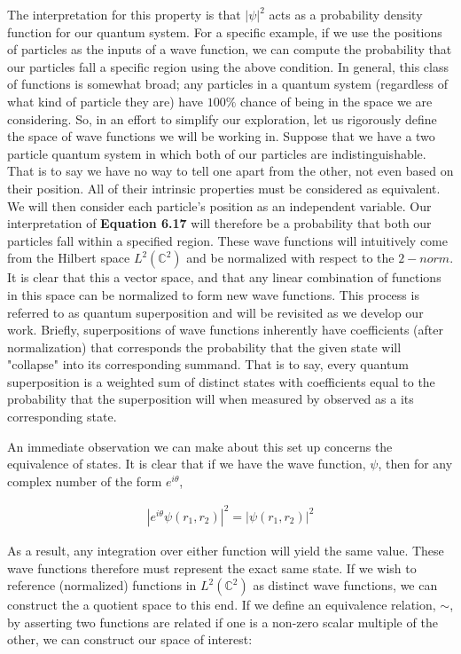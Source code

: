 \documentclass[10pt]{ucthesis}
\newcommand{\C}{\mathbb{C}}
\begin{document}
The interpretation for this property is that $|\psi|^2$ acts as a probability density function for our quantum system. For a specific example, if we use the positions of particles as the inputs of a wave function, we can compute the probability that our particles fall a specific region using the above condition. In general, this class of functions is somewhat broad; any particles in a quantum system (regardless of what kind of particle they are) have $100\%$ chance of being in the space we are considering. So, in an effort to simplify our exploration, let us rigorously define the space of wave functions we will be working in. Suppose that we have a two particle quantum system in which both of our particles are indistinguishable. That is to say we have no way to tell one apart from the other, not even based on their position. All of their intrinsic properties must be considered as equivalent. We will then consider each particle's position as an independent variable. Our interpretation of \textbf{Equation 6.17} will therefore be a probability that both our particles fall within a specified region. These wave functions will intuitively come from the Hilbert space $L^2(\C^2)$ and be normalized with respect to the $2-norm$. It is clear that this a vector space, and that any linear combination of functions in this space can be normalized to form new wave functions. This process is referred to as quantum superposition and will be revisited as we develop our work. Briefly, superpositions of wave functions inherently have coefficients (after normalization) that corresponds the probability that the given state will "collapse" into its corresponding summand. That is to say, every quantum superposition is a weighted sum of distinct states with coefficients equal to the probability that the superposition will when measured by observed as a its corresponding state.

An immediate observation we can make about this set up concerns the equivalence of states. It is clear that if we have the wave function, $\psi$, then for any complex number of the form $e^{i\theta}$,

\begin{equation}
	\begin{aligned}
		|e^{i\theta}\psi(r_1,r_2)|^2 = |\psi(r_1,r_2)|^2 
	\end{aligned}
\end{equation}

As a result, any integration over either function will yield the same value. These wave functions therefore must represent the exact same state. If we wish to reference (normalized) functions in $L^2(\C^2)$ as distinct wave functions, we can construct the a quotient space to this end. If we define an equivalence relation, $\sim$, by asserting two functions are related if one is a non-zero scalar multiple of the other, we can construct our space of interest:
\end{document}
